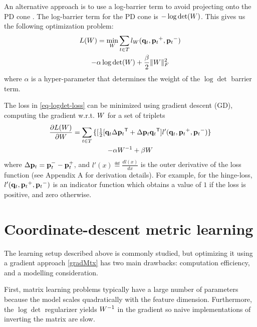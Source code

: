 \documentclass{article}
\begin{document}
An alternative approach is to use a log-barrier term to avoid projecting onto the PD cone \cite{davis2007information,lego}. The log-barrier term for the PD cone is $- \log \det ({W})$. This gives us the following optimization problem:
\begin{multline}
\label{eq-logdet-loss}
  L(W) = 
  \min_{{W}} \sum_{{t} \in T}  l_{{W}}({{\mathbf{q}}_{{t}}}, {{\mathbf{p}}_{{t}}}^+, {{\mathbf{p}}_{{t}}}^-) \\ 
  - \alpha \log \det({W}) + \frac{\beta}{2} {\|{W}\|_F^2}
\end{multline}
where $\alpha$ is a hyper-parameter that determines the weight of the
$\log \det$ barrier term.


The loss in \eqref{eq-logdet-loss} can be minimized using gradient descent (GD), computing the gradient w.r.t. ${W}$ for a set of triplets
\begin{multline}
  \frac{\partial {L ({W})}}{\partial {W}} = \sum\limits_{t\in T}{\{
  [\tfrac{1}{2}[{\mathbf{q}}_{t}\Delta{\mathbf{p}}_{t}{}^\mathsf{T} + \Delta{\mathbf{p}}_{t}{\mathbf{q}}_{t}{}^\mathsf{T}]  }
  {l'}({{\mathbf{q}}_{{t}}}, {{\mathbf{p}}_{{t}}}^{+}, {{\mathbf{p}}_{{t}}}^{-})\} \\- \alpha {W}^{-1} + \beta {W}
  \label{gradMtx}
\end{multline}
where $\Delta{\mathbf{p}}_t = {\mathbf{p}}_t^- - {\mathbf{p}}_t^+$, and $l'(x) \eqdef \frac{d{l(x)}}{dx}$ is the outer derivative of the loss function (see Appendix A for derivation details). For example, for the hinge-loss, 
$l'({{\mathbf{q}}_{{t}}}, {{\mathbf{p}}_{{t}}}^{+}, {{\mathbf{p}}_{{t}}}^{-})$ 
is an indicator function which obtains a value of $1$ if the loss is positive, and zero otherwise.


\section{Coordinate-descent metric learning}

The learning setup described above is commonly studied, but 
optimizing it using a gradient approach \eqref{gradMtx} has two main drawbacks: computation efficiency, and a modelling consideration.

First, matrix learning problems typically have a large number of parameters because the model scales quadratically with the feature dimension. %
Furthermore, the $\log \det$ regularizer yields  ${W}^{-1}$ in the gradient so naive implementations of inverting the matrix are slow.
\end{document}

